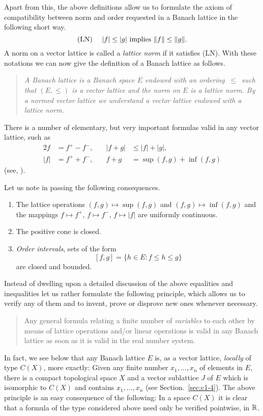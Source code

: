 Apart from this, the above definitions allow us to formulate the axiom of compatibility between norm and order requested in a Banach lattice in the following short way.
\begin{equation}\label{eq:c1-1}
	\text{(LN)} \quad \text{ $|f| \leq |g|$ implies $ \|f\| \leq \|g\| $.}   
\end{equation}
A norm on a vector lattice is called a \emph{lattice norm} if it satisfies (LN).
With these notations we can now give the definition of a Banach lattice as follows.
\begin{quote}
\textit{A \emph{Banach lattice} is a Banach space $ E $ endowed with an ordering $ \,\leq\, $ such that $ (E,\leq) $ is a vector lattice and the norm on $ E $ is a lattice norm.
By a \emph{normed vector lattice} we understand a vector lattice endowed with a lattice norm.}
\end{quote}
There is a number of elementary, but very important formulas valid in any vector lattice, such as
\begin{alignat*}{2}
f &= f^{+} - f^{-} ,   &\quad |f + g| & \leq |f| + |g|, \\
|f| &= f^{+} + f^{-} , &\quad  f + g  & = \sup(f,g) + \inf(f,g)
\end{alignat*}
(see, \eg \citet[Chap. II, §1]{schaefer:1974}).

Let us note in passing the following consequences.
%
\begin{enumerate}[\upshape (i)]
\item 
The lattice operations $ (f,g) \mapsto \sup(f,g) $ and $ (f,g) \mapsto \inf(f,g) $ and the mappings $ f \mapsto f^{+} $, $ f \mapsto f^{-} $, $ f \mapsto |f| $ are uniformly continuous.

\item 
The positive cone is closed.

\item 
\emph{Order intervals}, \ie sets of the form
\[
	\left[ f,g \right] = \{ h \in E \colon f \leq h \leq g \}
\]
are closed and bounded.
\end{enumerate}
Instead of dwelling upon a detailed discussion of the above equalities and inequalities let us rather formulate the following principle, which allows us to verify any of them and to invent, prove or disprove new ones whenever necessary.
\begin{quote}
Any general formula relating a finite number of \emph{variables} to each other by means of lattice operations and/or linear operations is valid in any Banach lattice as soon as it is valid in the real number system. 
\end{quote}
In fact, we see below that any Banach lattice $ E $ is, as a vector lattice, \emph{locally} of type $ C(X) $, more exactly:
Given any finite number $ x_{1},\ldots,x_{n} $ of elements in $ E $, there is a compact topological space $ X $ and a vector sublattice $ J $ of $ E $ which is isomorphic to $ C(X) $ and contains $ x_{1},\ldots,x_{n} $ (see Section.~\ref{sec:c1-4}).
The above principle is an easy consequence of the following:
In a space $ C(X) $ it is clear that a formula of the type considered above need only be verified pointwise, \ie  in $ \mathbb{R} $.

